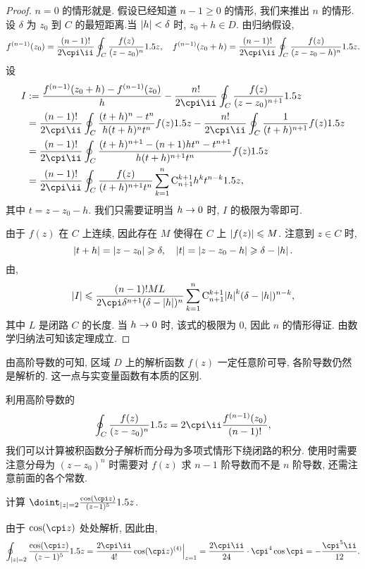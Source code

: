 \begin{proof}
  $n=0$ 的情形就是\thmCI.
  假设已经知道 $n-1\ge0$ 的情形, 我们来推出 $n$ 的情形.
  设 $\delta$ 为 $z_0$ 到 $C$ 的最短距离.当 $\left|h\right|<\delta$ 时, $z_0+h\in D$.
  由归纳假设,
  \[
    f^{(n-1)}(z_0)=\frac{(n-1)!}{2\cpi\ii}\oint_C \frac{f(z)}{(z-z_0)^n}\d z,\quad
    f^{(n-1)}(z_0+h)=\frac{(n-1)!}{2\cpi\ii}\oint_C \frac{f(z)}{(z-z_0-h)^n}\d z.
  \]
  设
  \begin{align*}
    I&:=\frac{f^{(n-1)}(z_0+h)-f^{(n-1)}(z_0)}h-\frac{n!}{2\cpi\ii}\oint_C \frac{f(z)}{(z-z_0)^{n+1}}\d z\\&
    =\frac{(n-1)!}{2\cpi\ii}\oint_C \frac{(t+h)^n-t^n}{h(t+h)^nt^n}f(z)\d z
    -\frac{n!}{2\cpi\ii}\oint_C \frac1{(t+h)^{n+1}}f(z)\d z\\&
    =\frac{(n-1)!}{2\cpi\ii}\oint_C \frac{(t+h)^{n+1}-(n+1)ht^n-t^{n+1}}{h(t+h)^{n+1}t^n}f(z)\d z\\&
    =\frac{(n-1)!}{2\cpi\ii}\oint_C \frac{f(z)}{(t+h)^{n+1}t^n}\sum_{k=1}^n\rmC_{n+1}^{k+1} h^kt^{n-k}\d z,
  \end{align*}
  其中 $t=z-z_0-h$.
  我们只需要证明当 $h\rightarrow 0$ 时, $I$ 的极限为零即可.

  由于 $f(z)$ 在 $C$ 上连续, 因此存在 $M$ 使得在 $C$ 上 $\left|f(z)\right|\leqslant M$. 注意到 $z\in C$ 时,
  \[
    \left|t+h\right|=\left|z-z_0\right|\geqslant \delta,\quad
    \left|t\right|=\left|z-z_0-h\right|\geqslant\delta-\left|h\right|.
  \]
  由\thmGrowUp,
  \[
    \abs{I}\le \frac{(n-1)!ML}{2\cpi\delta^{n+1}(\delta-\abs{h})^n}
      \sum_{k=1}^n\rmC_{n+1}^{k+1} {\abs{h}}^k(\delta-\abs{h})^{n-k},
  \]
  其中 $L$ 是闭路 $C$ 的长度.
  当 $h\rightarrow0$ 时, 该式的极限为 $0$, 因此 $n$ 的情形得证.
  由数学归纳法可知该定理成立.
\end{proof}

由高阶导数的\thmCIH 可知, 区域 $D$ 上的\alert{解析函数 $f(z)$ 一定任意阶可导}, 各阶导数仍然是解析的.
这一点与实变量函数有本质的区别.

利用高阶导数的\thmCIH 
\[
   \oint_C \frac{f(z)}{(z-z_0)^{n}}\d z
  =2\cpi\ii\frac{f^{(n-1)}(z_0)}{(n-1)!},
\]
我们可以计算被积函数分子解析而分母为多项式情形下绕闭路的积分.
使用时需要注意分母为 $(z-z_0)^n$ 时需要\alert{对 $f(z)$ 求 $n-1$ 阶导数而不是 $n$ 阶导数}, 还需注意前面的各个常数.

\begin{example}
  计算 $\doint_{\abs{z}=2}\frac{\cos(\cpi z)}{(z-1)^5}\d z$.
\end{example}

\begin{solution}
  由于 $\cos(\cpi z)$ 处处解析, 因此由\thmCIH,
  \[
    \oint_{\abs{z}=2}\frac{\cos(\cpi z)}{(z-1)^5}\d z
    =\frac{2\cpi\ii}{4!}\cos(\cpi z)^{(4)}\Big|_{z=1}
    =\frac{2\cpi\ii}{24}\cdot \cpi^4\cos \cpi
    =-\frac{\cpi^5\ii }{12}.
  \]
\end{solution}

